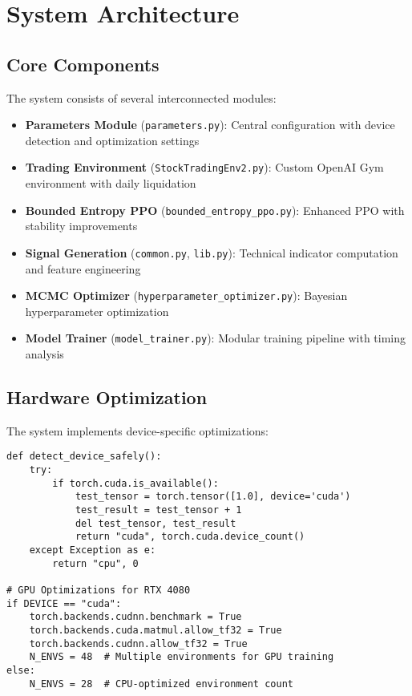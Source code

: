 \documentclass[11pt,a4paper]{article}
\begin{document}
\section{System Architecture}

\subsection{Core Components}

The system consists of several interconnected modules:

\begin{itemize}
    \item \textbf{Parameters Module} (\texttt{parameters.py}): Central configuration with device detection and optimization settings
    \item \textbf{Trading Environment} (\texttt{StockTradingEnv2.py}): Custom OpenAI Gym environment with daily liquidation
    \item \textbf{Bounded Entropy PPO} (\texttt{bounded\_entropy\_ppo.py}): Enhanced PPO with stability improvements
    \item \textbf{Signal Generation} (\texttt{common.py}, \texttt{lib.py}): Technical indicator computation and feature engineering
    \item \textbf{MCMC Optimizer} (\texttt{hyperparameter\_optimizer.py}): Bayesian hyperparameter optimization
    \item \textbf{Model Trainer} (\texttt{model\_trainer.py}): Modular training pipeline with timing analysis
\end{itemize}

\subsection{Hardware Optimization}

The system implements device-specific optimizations:

\begin{lstlisting}[caption={Device Detection and Optimization (parameters.py:44-102)}]
def detect_device_safely():
    try:
        if torch.cuda.is_available():
            test_tensor = torch.tensor([1.0], device='cuda')
            test_result = test_tensor + 1
            del test_tensor, test_result
            return "cuda", torch.cuda.device_count()
    except Exception as e:
        return "cpu", 0

# GPU Optimizations for RTX 4080
if DEVICE == "cuda":
    torch.backends.cudnn.benchmark = True
    torch.backends.cuda.matmul.allow_tf32 = True
    torch.backends.cudnn.allow_tf32 = True
    N_ENVS = 48  # Multiple environments for GPU training
else:
    N_ENVS = 28  # CPU-optimized environment count
\end{lstlisting}
\end{document}
